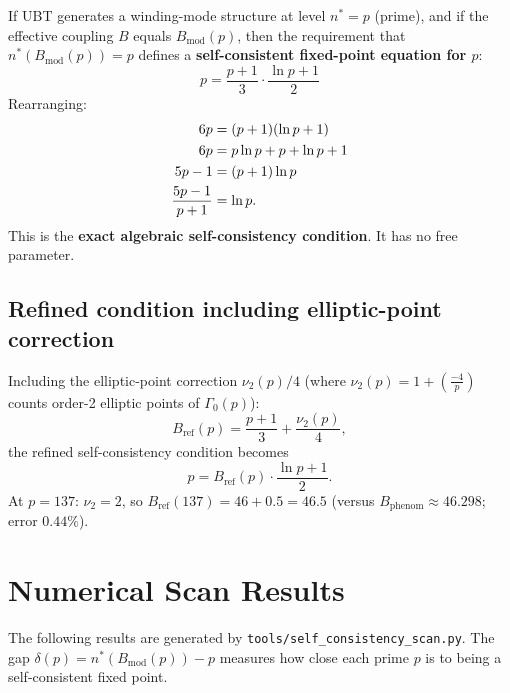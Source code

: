 \documentclass[12pt,a4paper]{article}
\theoremstyle{definition}
\theoremstyle{remark}
\begin{document}
If UBT generates a winding-mode structure at level $n^* = p$ (prime), and if
the effective coupling $B$ equals $B_{\mathrm{mod}}(p)$, then the requirement
that $n^*(B_{\mathrm{mod}}(p)) = p$ defines a \textbf{self-consistent
fixed-point equation for $p$}:
\begin{equation}
  \boxed{p = \frac{p+1}{3} \cdot \frac{\ln p + 1}{2}}
  \label{eq:SC_basic}
\end{equation}
Rearranging:
\begin{align}
  6p &= (p+1)(\ln p + 1) \notag\\
  6p &= p\ln p + p + \ln p + 1 \notag\\
  5p - 1 &= (p+1)\ln p \notag\\
  \frac{5p-1}{p+1} &= \ln p .
  \label{eq:SC_exact}
\end{align}
This is the \textbf{exact algebraic self-consistency condition}.  It has no free
parameter.

\subsection{Refined condition including elliptic-point correction}

Including the elliptic-point correction $\nu_2(p)/4$ (where $\nu_2(p) =
1 + \left(\tfrac{-4}{p}\right)$ counts order-2 elliptic points of $\Gamma_0(p)$):
\begin{equation}
  B_{\mathrm{ref}}(p) = \frac{p+1}{3} + \frac{\nu_2(p)}{4} ,
  \label{eq:Bref}
\end{equation}
the refined self-consistency condition becomes
\begin{equation}
  p = B_{\mathrm{ref}}(p)\cdot\frac{\ln p + 1}{2} .
  \label{eq:SC_refined}
\end{equation}
At $p=137$: $\nu_2=2$, so $B_{\mathrm{ref}}(137) = 46 + 0.5 = 46.5$ (versus
$B_{\mathrm{phenom}} \approx 46.298$; error $0.44\%$).

\section{Numerical Scan Results}
\label{sec:sc:numerical}

The following results are generated by \texttt{tools/self\_consistency\_scan.py}.
The gap $\delta(p) = n^*(B_{\mathrm{mod}}(p)) - p$ measures how close each prime
$p$ is to being a self-consistent fixed point.
\end{document}
